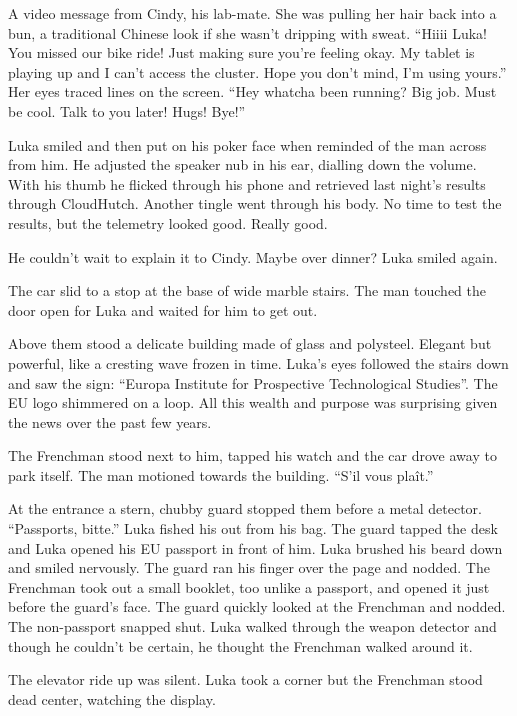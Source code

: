 \documentclass[ebook,11pt,oneside,openany]{memoir}
\newcommand{\scenechange}{
  \par
  \vspace{\baselineskip}
  \par
\noindent}
\begin{document}
A video message from Cindy, his lab-mate. She was pulling her hair back into a bun, a traditional Chinese look if she wasn't dripping with sweat. ``Hiiii Luka! You missed our bike ride! Just making sure you're feeling okay. My tablet is playing up and I can't access the cluster. Hope you don't mind, I'm using yours.'' Her eyes traced lines on the screen. ``Hey whatcha been running? Big job. Must be cool. Talk to you later! Hugs! Bye!''

Luka smiled and then put on his poker face when reminded of the man across from him. He adjusted the speaker nub in his ear, dialling down the volume. With his thumb he flicked through his phone and retrieved last night's results through CloudHutch. Another tingle went through his body. No time to test the results, but the telemetry looked good. Really good.

He couldn't wait to explain it to Cindy. Maybe over dinner? Luka smiled again.

The car slid to a stop at the base of wide marble stairs. The man touched the door open for Luka and waited for him to get out.

Above them stood a delicate building made of glass and polysteel. Elegant but powerful, like a cresting wave frozen in time. Luka's eyes followed the stairs down and saw the sign: ``Europa Institute for Prospective Technological Studies''. The EU logo shimmered on a loop. All this wealth and purpose was surprising given the news over the past few years.

The Frenchman stood next to him, tapped his watch and the car drove away to park itself. The man motioned towards the building. ``S'il vous plaît.''

At the entrance a stern, chubby guard stopped them before a metal detector. ``Passports, bitte.'' Luka fished his out from his bag. The guard tapped the desk and Luka opened his EU passport in front of him. Luka brushed his beard down and smiled nervously. The guard ran his finger over the page and nodded. The Frenchman took out a small booklet, too unlike a passport, and opened it just before the guard's face. The guard quickly looked at the Frenchman and nodded. The non-passport snapped shut. Luka walked through the weapon detector and though he couldn't be certain, he thought the Frenchman walked around it.

\scenechange

The elevator ride up was silent. Luka took a corner but the Frenchman stood dead center, watching the display.
\end{document}
